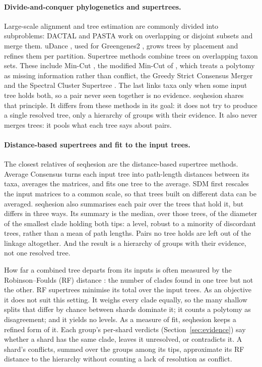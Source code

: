 \documentclass[11pt,a4paper]{article}
\newcommand{\seqhesion}{\textsf{seqhesion}}
\begin{document}
\paragraph{Divide-and-conquer phylogenetics and supertrees.}
Large-scale alignment and tree estimation are commonly divided into subproblems: DACTAL
\citep{nelesen2012dactal} and PASTA \citep{mirarab2015pasta} work on overlapping or disjoint subsets
and merge them. uDance \citep{balaban2024udance}, used for Greengenes2
\citep{mcdonald2024greengenes2}, grows trees by placement and refines them per partition.
Supertree methods combine trees on overlapping taxon sets. These include Min-Cut
\citep{semple2000mincut}, the modified Min-Cut of \citet{page2002mincut}, which treats a polytomy
as missing information rather than conflict, the Greedy Strict Consensus Merger
\citep{fleischauer2016gscm} and the Spectral Cluster Supertree \citep{mcarthur2024scs}. The last
links taxa only when some input tree holds both, so a pair never seen together is no evidence.
\seqhesion{} shares that principle. It differs from these methods in its goal: it does not try to
produce a single resolved tree, only a hierarchy of groups with their evidence. It also never merges
trees: it pools what each tree says about pairs.

\paragraph{Distance-based supertrees and fit to the input trees.}
The closest relatives of \seqhesion{} are the distance-based supertree methods. Average Consensus
\citep{lapointe1997average} turns each input tree into path-length distances between its taxa,
averages the matrices, and fits one tree to the average. SDM \citep{criscuolo2006sdm} first
rescales the input matrices to a common scale, so that trees built on different data can be
averaged. \seqhesion{} also summarises each pair over the trees that hold it, but differs in
three ways. Its summary is the median, over those trees, of the diameter of the smallest clade
holding both tips: a level, robust to a minority of discordant trees, rather than a mean of
path lengths. Pairs no tree holds are left out of the linkage altogether. And the
result is a hierarchy of groups with their evidence, not one resolved tree.

How far a combined tree departs from its inputs is often measured by the Robinson--Foulds (RF)
distance \citep{robinson1981comparison}: the number of clades found in one tree but not the other.
RF supertrees \citep{bansal2010rfsupertrees} minimise its total over the input trees. As an objective
it does not suit this setting. It weighs every clade equally, so the many shallow splits that differ
by chance between shards dominate it; it counts a polytomy as disagreement; and it yields no levels.
As a measure of fit, \seqhesion{} keeps a refined form of it. Each group's per-shard verdicts
(Section~\ref{sec:evidence}) say whether a shard has the same clade, leaves it unresolved, or
contradicts it. A shard's conflicts, summed over the groups among its tips, approximate its RF
distance to the hierarchy without counting a lack of resolution as conflict.
\end{document}
